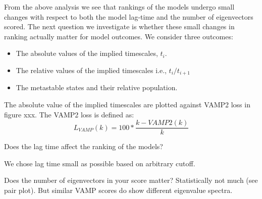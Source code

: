 \documentclass[journal=jacsat,manuscript=article]{achemso}
\begin{document}
From the above analysis we see that rankings of the models undergo small changes with respect to both the model lag-time and the number of eigenvectors scored. The next question we investigate is whether these small changes in ranking actually matter for model outcomes.  We consider three outcomes: 
\begin{itemize}
    \item The absolute values of the implied timescales, $t_{i}$. 
    \item The relative values of the implied timescales i.e., $t_i/t_{i+1}$
    \item The metastable states and their relative population. 
\end{itemize}

The absolute value of the implied timescales are plotted against VAMP2 loss in figure xxx. The VAMP2 loss is defined as: 
\begin{equation}
    L_{VAMP}(k)= 100*\frac{k-VAMP2(k)}{k}
\end{equation}

Does the lag time affect the ranking of the models? 

We chose lag time small as possible based on arbitrary cutoff.  

Does the number of eigenvectors in your score matter? Statistically not much (see pair plot). But similar VAMP scores do show different eigenvalue spectra. 



\end{document}
